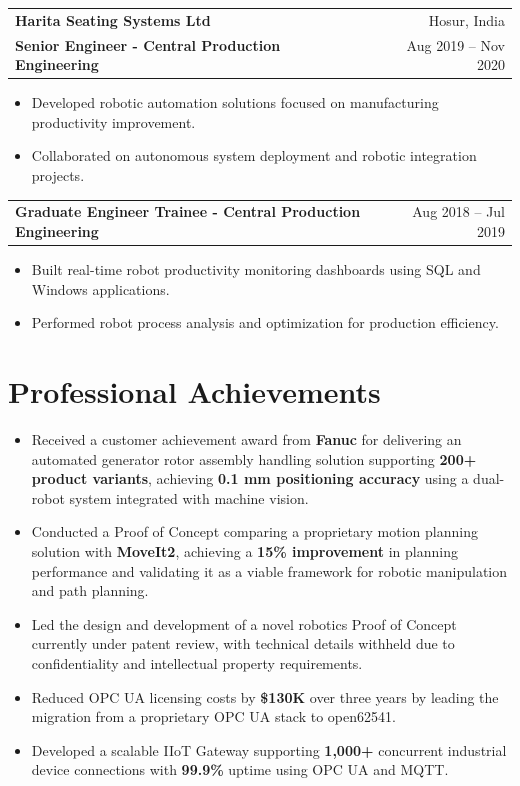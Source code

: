 \documentclass[a4paper,12pt]{article}
\newcommand{\cvspacing}{3pt}
\newcommand{\company}[2]{\textbf{#1} & #2 \\[\cvspacing]}
\newcommand{\designation}[2]{\textbf{#1} & #2 \\[\cvspacing]}
\newcommand{\designationpoints}[1]{
\begin{itemize}[
    leftmargin=*,
    itemsep=\cvspacing,
    topsep=0pt,
    parsep=0pt,
    partopsep=0pt,
]
#1
\end{itemize}
}
\let\achievementpoints\designationpoints
\begin{document}
\begin{tabularx}{\linewidth}{@{}X r@{}}
\company{Harita Seating Systems Ltd}{Hosur, India}
\designation
{Senior Engineer - Central Production Engineering}
{Aug 2019 -- Nov 2020}
\end{tabularx}
\designationpoints{
\item Developed robotic automation solutions focused on manufacturing productivity improvement.
\item Collaborated on autonomous system deployment and robotic integration projects.
}
\begin{tabularx}{\linewidth}{@{}X r@{}}
\designation
{Graduate Engineer Trainee - Central Production Engineering}
{Aug 2018 -- Jul 2019}
\end{tabularx}
\designationpoints{
\item Built real-time robot productivity monitoring dashboards using SQL and Windows applications.
\item Performed robot process analysis and optimization for production efficiency.
}

\section{Professional Achievements}
\achievementpoints{
\item Received a customer achievement award from \textbf{Fanuc} for delivering an automated generator rotor assembly handling solution supporting \textbf{200+ product variants}, achieving \textbf{0.1 mm positioning accuracy} using a dual-robot system integrated with machine vision.
\item Conducted a Proof of Concept comparing a proprietary motion planning solution with \textbf{MoveIt2}, achieving a \textbf{15\% improvement} in planning performance and validating it as a viable framework for robotic manipulation and path planning.
\item Led the design and development of a novel robotics Proof of Concept currently under patent review, with technical details withheld due to confidentiality and intellectual property requirements.
\item Reduced OPC UA licensing costs by \textbf{\$130K} over three years by leading the migration from a proprietary OPC UA stack to open62541.
\item Developed a scalable IIoT Gateway supporting \textbf{1,000+} concurrent industrial device connections with \textbf{99.9\%} uptime using OPC UA and MQTT.

}
\end{document}
